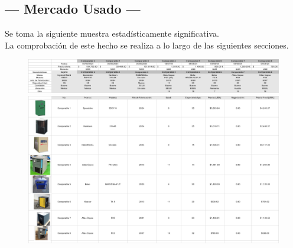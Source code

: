 \subsection{\centering --- Mercado Usado ---} %
Se toma la siguiente muestra estadísticamente significativa. \\ 
La comprobación de este hecho se realiza a lo largo de las siguientes secciones.
\begin{figure}[hbtp!]
	\centering
\includegraphics[width=  \linewidth, page = 1]{../0.imagenes/CAP_8/mercado_5_1}
\includegraphics[width=  \linewidth, page = 1]{../0.imagenes/CAP_8/mercado_5_2}
\end{figure}

